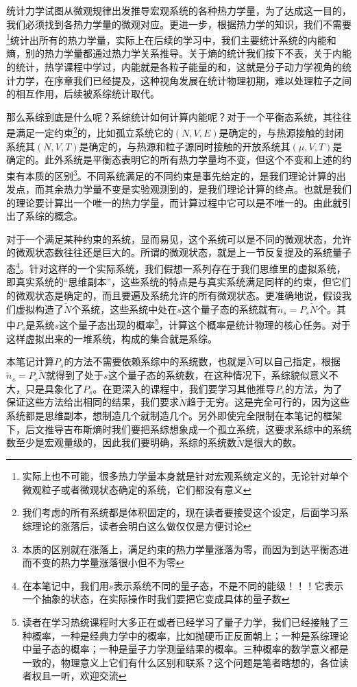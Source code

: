 \documentclass[../../main.tex]{subfiles}
\begin{document}
统计力学试图从微观规律出发推导宏观系统的各种热力学量，为了达成这一目的，我们必须找到各热力学量的微观对应。更进一步，根据热力学的知识，我们不需要\footnote{实际上也不可能，很多热力学量本身就是针对宏观系统定义的，无论针对单个微观粒子或者微观状态确定的系统，它们都没有意义}统计出所有的热力学量，实际上在后续的学习中，我们主要统计系统的内能和熵，别的热力学量都通过热力学关系推导。关于熵的统计我们按下不表，关于内能的统计，热学课程中学过，内能就是各粒子能量的和，这就是分子动力学视角的统计力学，在序章我们已经提及，这种视角发展在统计物理初期，难以处理粒子之间的相互作用，后续被系综统计取代。

那么系综到底是什么呢？系综统计如何计算内能呢？对于一个平衡态系统，其往往是满足一定约束\footnote{我们考虑的所有系统都是体积固定的，现在读者要接受这个设定，后面学习系综理论的涨落后，读者会明白这么做仅仅是方便讨论}的，比如孤立系统它的\(\left(N,V,E\right)\)是确定的，与热源接触的封闭系统其\(\left(N,V,T\right)\)是确定的，与热源和粒子源同时接触的开放系统其\(\left(\mu,V,T\right)\)是确定的。此外系统是平衡态表明它的所有热力学量均不变，但这个不变和上述的约束有本质的区别\footnote{本质的区别就在涨落上，满足约束的热力学量涨落为零，而因为到达平衡态进而不变的热力学量涨落很小但不为零}。不同系统满足的不同约束是事先给定的，是我们理论计算的出发点，而其余热力学量不变是实验观测到的，是我们理论计算的终点。也就是我们的理论要计算出一个唯一的热力学量，而计算过程中它可以是不唯一的。由此就引出了系综的概念。

对于一个满足某种约束的系统，显而易见，这个系统可以是不同的微观状态，允许的微观状态数往往还是巨大的。所谓的微观状态，就是上一节反复提及的系统量子态\footnote{在本笔记中，我们用\(s\)表示系统不同的量子态，不是不同的能级！！！它表示一个抽象的状态，在实际操作时我们要把它变成具体的量子数}。针对这样的一个实际系统，我们假想一系列存在于我们思维里的虚拟系统，即真实系统的“思维副本”，这些系统的特点是与真实系统满足同样的约束，但它们的微观状态是确定的，而且要遍及系统允许的所有微观状态。更准确地说，假设我们虚拟构造了\(\tilde{N}\)个系统，这些系统中处在\(s\)这个量子态的系统就有\(\tilde{n}_s=P_s\tilde{N}\)个。其中\(P_s\)是系统\(s\)这个量子态出现的概率\footnote{读者在学习热统课程时大多正在或者已经学习了量子力学，我们已经接触了三种概率，一种是经典力学中的概率，比如抛硬币正反面朝上；一种是系综理论中量子态的概率；一种是量子力学测量结果的概率。三种概率的数学意义都是一致的，物理意义上它们有什么区别和联系？这个问题是笔者瞎想的，各位读者权且一听，欢迎交流}，计算这个概率是统计物理的核心任务。对于这样虚拟出来的一堆系统，构成的集合就是系综。

本笔记计算\(P_s\)的方法不需要依赖系综中的系统数，也就是\(\tilde{N}\)可以自己指定，根据\(\tilde{n}_s=P_s\tilde{N}\)就得到了处于\(s\)这个量子态的系统数，在这种情况下，系综貌似意义不大，只是具象化了\(P_s\)。在更深入的课程中，我们要学习其他推导\(P_s\)的方法，为了保证这些方法给出相同的结果，我们要求\(\tilde{N}\)趋于无穷。这是完全可行的，因为这些系统都是思维副本，想制造几个就制造几个。另外即使完全限制在本笔记的框架下，后文推导吉布斯熵时我们要把系综想象成一个孤立系统，这要求系综中的系统数至少是宏观量级的，因此我们要明确，系综的系统数\(\tilde{N}\)是很大的数。
\end{document}
